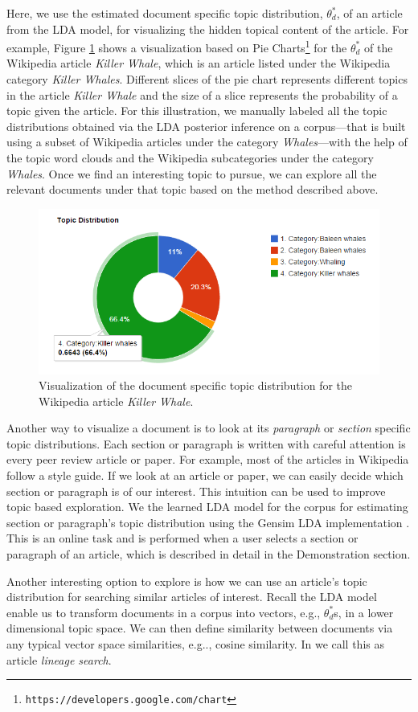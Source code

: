 Here, we use the estimated document specific topic distribution, 
$\theta^*_{d}$, of an article from the LDA model, for visualizing 
the hidden topical content of the article. For example, Figure
\ref{fig:doc-topic-distribution} shows a visualization based on Pie
Charts\footnote{\texttt{https://developers.google.com/chart}} for 
the $\theta^*_{d}$ of the Wikipedia article \textit{Killer Whale}, 
which is an article listed under the Wikipedia category          
\textit{Killer Whales}. Different slices of the pie chart represents
different topics in the article \textit{Killer Whale} and the size 
of a slice represents the probability of a topic given the article. 
For this illustration, we manually labeled all the topic 
distributions obtained via the LDA posterior inference on a 
corpus---that is built using a subset of Wikipedia articles under the 
category \textit{Whales}---with the help of the topic word clouds 
and the Wikipedia subcategories under the category \textit{Whales}.         
Once we find an interesting topic to pursue, we can explore all 
the relevant documents under that topic based on the method 
described above. 

\begin{figure}[htb]\centering 
\includegraphics[width=.45\textwidth]{images/doc_topic_distribution.png}
\caption{Visualization of the document specific topic distribution 
for the Wikipedia article \textit{Killer Whale}.}
\label{fig:doc-topic-distribution}
\end{figure}

Another way to visualize a document is to look at its 
\textsl{paragraph} or \textsl{section} specific topic distributions. 
Each section or paragraph is written with careful attention is every 
peer review article or paper. For example, most of the articles in 
Wikipedia follow a style guide. If we look at an article or paper,  
we can easily decide which section or paragraph is of our interest. 
This intuition can be used to improve topic based exploration. We 
the learned LDA model for the corpus for estimating section or 
paragraph's topic distribution using the Gensim LDA implementation 
\cite{rehurek_lrec}. This is an online task and is performed when a 
user selects a section or paragraph of an article, which is 
described in detail in the \system Demonstration section.  


Another interesting option to explore is how we can use an article's 
topic distribution for searching similar articles of interest. 
Recall the LDA model enable us to transform documents in a 
corpus into vectors, e.g., $\theta^*_{d}$s, in a lower dimensional 
topic space. We can then define similarity between documents via any 
typical vector space similarities, e.g.., cosine similarity. In 
\system we call this as article \textsl{lineage search}.         

